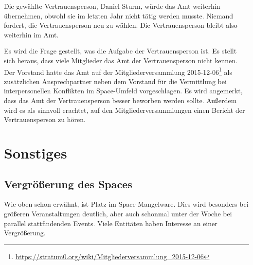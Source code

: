 \documentclass{s0minutes}
\begin{document}
Die gewählte Vertrauensperson, Daniel Sturm, würde das Amt weiterhin
übernehmen, obwohl sie im letzten Jahr nicht tätig werden musste. Niemand
fordert, die Vertrauensperson neu zu wählen. Die Vertrauensperson bleibt also
weiterhin im Amt.

Es wird die Frage gestellt, was die Aufgabe der Vertrauensperson ist. Es stellt
sich heraus, dass viele Mitglieder das Amt der Vertrauensperson nicht kennen.
Der Vorstand hatte das Amt auf der Mitgliederversammlung
2015-12-06\footnote{\url{https://stratum0.org/wiki/Mitgliederversammlung_2015-12-06}}
als zusätzlichen Ansprechpartner neben dem Vorstand für die Vermittlung bei
interpersonellen Konflikten im Space-Umfeld vorgeschlagen. Es wird angemerkt,
dass das Amt der Vertrauensperson besser beworben werden sollte. Außerdem wird
es als sinnvoll erachtet, auf den Mitgliederversammlungen einen Bericht der
Vertrauensperson zu hören.

\section{Sonstiges}

\subsection{Vergrößerung des Spaces}

Wie oben schon erwähnt, ist Platz im Space Mangelware. Dies wird besonders bei
größeren Veranstaltungen deutlich, aber auch schonmal unter der Woche bei
parallel stattfindenden Events. Viele Entitäten haben Interesse an einer
Vergrößerung.
\end{document}
